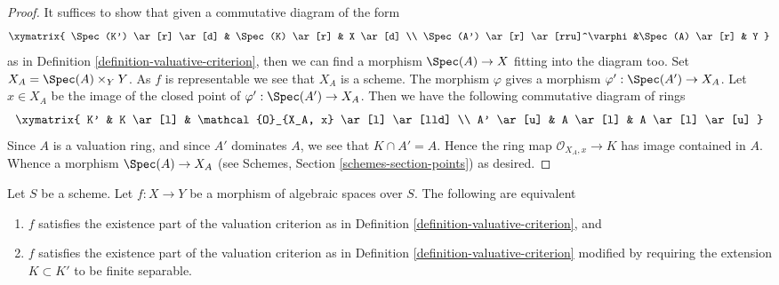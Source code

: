 \begin{proof}
It suffices to show that given a commutative diagram of the form
$$
\xymatrix{
\Spec(K') \ar[r] \ar[d] & \Spec(K) \ar[r] & X \ar[d] \\
\Spec(A') \ar[r] \ar[rru]^\varphi &\Spec(A) \ar[r] & Y
}
$$
as in Definition \ref{definition-valuative-criterion}, then we can
find a morphism $\Spec(A) \to X$ fitting into the diagram too.
Set $X_A = \Spec(A) \times_Y Y$. As $f$ is representable we see
that $X_A$ is a scheme. The morphism $\varphi$ gives a morphism
$\varphi' : \Spec(A') \to X_A$. Let $x \in X_A$ be the image of
the closed point of $\varphi' : \Spec(A') \to X_A$. Then we
have the following commutative diagram of rings
$$
\xymatrix{
K' & K \ar[l] & \mathcal{O}_{X_A, x} \ar[l] \ar[lld] \\
A' \ar[u] & A \ar[l] & A \ar[l] \ar[u]
}
$$
Since $A$ is a valuation ring, and since $A'$ dominates $A$, we see
that $K \cap A' = A$. Hence the ring map $\mathcal{O}_{X_A, x} \to K$
has image contained in $A$. Whence a morphism $\Spec(A) \to X_A$ (see
Schemes, Section \ref{schemes-section-points})
as desired.
\end{proof}

\begin{lemma}
\label{lemma-finite-separable-enough}
Let $S$ be a scheme.
Let $f : X \to Y$ be a morphism of algebraic spaces over $S$.
The following are equivalent
\begin{enumerate}
\item $f$ satisfies the existence part of the valuation criterion
as in Definition \ref{definition-valuative-criterion}, and
\item $f$ satisfies the existence part of the valuation criterion
as in Definition \ref{definition-valuative-criterion} modified by
requiring the extension $K \subset K'$ to be finite separable.
\end{enumerate}
\end{lemma}

